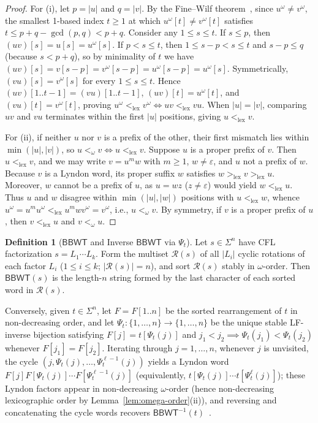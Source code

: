 \documentclass[11pt,a4paper]{article}
\theoremstyle{definition}
\newtheorem{definition}{Definition}
\newcommand{\BBWT}{\mathsf{BBWT}}
\newcommand{\lex}{\mathrm{lex}}
\begin{document}
\begin{proof}
For (i), let $p = |u|$ and $q = |v|$. By the Fine--Wilf theorem~\cite{FineWilf1965}, since $u^\omega \neq v^\omega$, the smallest 1-based index $t \ge 1$ at which $u^\omega[t] \neq v^\omega[t]$ satisfies $t \le p + q - \gcd(p, q) < p + q$. Consider any $1 \le s \le t$. If $s \le p$, then $(uv)[s] = u[s] = u^\omega[s]$. If $p < s \le t$, then $1 \le s - p < s \le t$ and $s - p \le q$ (because $s < p + q$), so by minimality of $t$ we have $(uv)[s] = v[s - p] = v^\omega[s - p] = u^\omega[s - p] = u^\omega[s]$. Symmetrically, $(vu)[s] = v^\omega[s]$ for every $1 \le s \le t$. Hence $(uv)[1..t-1] = (vu)[1..t-1]$, $(uv)[t] = u^\omega[t]$, and $(vu)[t] = v^\omega[t]$, proving $u^\omega <_{\lex} v^\omega \iff uv <_{\lex} vu$. When $|u| = |v|$, comparing $uv$ and $vu$ terminates within the first $|u|$ positions, giving $u <_{\lex} v$.

For (ii), if neither $u$ nor $v$ is a prefix of the other, their first mismatch lies within $\min(|u|,|v|)$, so $u <_\omega v \iff u <_{\lex} v$. Suppose $u$ is a proper prefix of $v$. Then $u <_{\lex} v$, and we may write $v = u^m w$ with $m \ge 1$, $w \neq \varepsilon$, and $u$ not a prefix of $w$. Because $v$ is a Lyndon word, its proper suffix $w$ satisfies $w >_{\lex} v >_{\lex} u$. Moreover, $w$ cannot be a prefix of $u$, as $u = w z$ ($z \neq \varepsilon$) would yield $w <_{\lex} u$. Thus $u$ and $w$ disagree within $\min(|u|,|w|)$ positions with $u <_{\lex} w$, whence $u^\omega = u^m u^\omega <_{\lex} u^m w v^\omega = v^\omega$, i.e., $u <_\omega v$. By symmetry, if $v$ is a proper prefix of $u$, then $v <_{\lex} u$ and $v <_\omega u$.
\end{proof}

\begin{definition}[$\BBWT$ and Inverse $\BBWT$ via $\Psi_t$]
Let $s \in \Sigma^n$ have CFL factorization $s = L_1 \cdots L_k$. Form the multiset $\mathcal{R}(s)$ of all $|L_i|$ cyclic rotations of each factor $L_i$ ($1 \le i \le k$; $|\mathcal{R}(s)| = n$), and sort $\mathcal{R}(s)$ stably in $\omega$-order. Then $\BBWT(s)$ is the length-$n$ string formed by the last character of each sorted word in $\mathcal{R}(s)$.

Conversely, given $t \in \Sigma^n$, let $F = F[1..n]$ be the sorted rearrangement of $t$ in non-decreasing order, and let $\Psi_t : \{1,\dots,n\} \to \{1,\dots,n\}$ be the unique stable LF-inverse bijection satisfying $F[j] = t[\Psi_t(j)]$ and $j_1 < j_2 \implies \Psi_t(j_1) < \Psi_t(j_2)$ whenever $F[j_1] = F[j_2]$. Iterating through $j = 1, \dots, n$, whenever $j$ is unvisited, the cycle $(j, \Psi_t(j), \dots, \Psi_t^{\ell-1}(j))$ yields a Lyndon word $F[j]F[\Psi_t(j)]\cdots F[\Psi_t^{\ell-1}(j)]$ (equivalently, $t[\Psi_t(j)]\cdots t[\Psi_t^\ell(j)]$); these Lyndon factors appear in non-decreasing $\omega$-order (hence non-decreasing lexicographic order by Lemma~\ref{lem:omega-order}(ii)), and reversing and concatenating the cycle words recovers $\BBWT^{-1}(t)$~\cite{Kufleitner2009,GilScott2012,BadkobehBannaiIKoppl2026}.
\end{definition}
\end{document}
